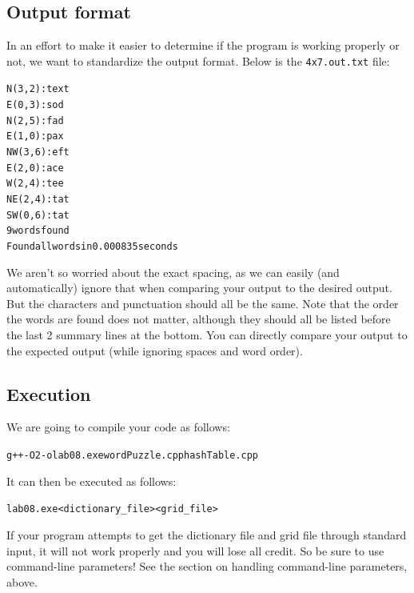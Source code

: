 \documentclass[11pt]{article}
\begin{document}
\subsection*{Output format}
In an effort to make it easier to determine if the program is working properly or not, we want to standardize the output format. Below is the \texttt{4x7.out.txt} file:
\begin{alltt}
N (3, 2):       text
E (0, 3):       sod
N (2, 5):       fad
E (1, 0):       pax
NW(3, 6):       eft
E (2, 0):       ace
W (2, 4):       tee
NE(2, 4):       tat
SW(0, 6):       tat
9 words found
Found all words in 0.000835 seconds
\end{alltt}

We aren't so worried about the exact spacing, as we can easily (and automatically) ignore that when comparing your output to the desired output. But the characters and punctuation should all be the same. Note that the order the words are found does not matter, although they should all be listed before the last 2 summary lines at the bottom. You can directly compare your output to the expected output (while ignoring spaces and word order).

\subsection*{Execution}
We are going to compile your code as follows:
\begin{alltt}
g++ -O2 -o lab08.exe wordPuzzle.cpp hashTable.cpp
\end{alltt}
It can then be executed as follows:
\begin{alltt}
lab08.exe <dictionary_file> <grid_file>
\end{alltt}

\quad If your program attempts to get the dictionary file and grid file through standard input, it will not work properly and you will lose all credit. So be sure to use command-line parameters! See the section on handling command-line parameters, above.
\end{document}
